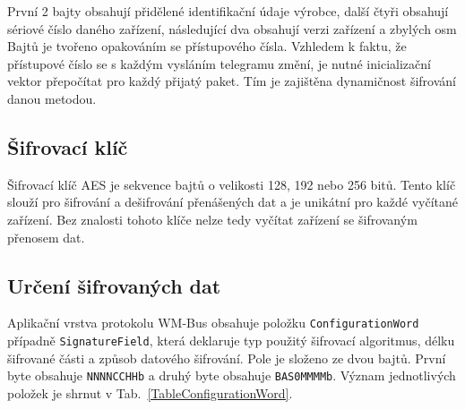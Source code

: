 První 2 bajty obsahují přidělené identifikační údaje výrobce, další čtyři obsahují sériové číslo daného zařízení, následující dva obsahují verzi zařízení a zbylých osm Bajtů je tvořeno opakováním se přístupového čísla. Vzhledem k faktu, že přístupové číslo se s každým vysláním telegramu změní, je nutné inicializační vektor přepočítat pro každý přijatý paket. Tím je zajištěna dynamičnost šifrování danou metodou.

\subsection{Šifrovací klíč}
Šifrovací klíč AES je sekvence bajtů o velikosti 128, 192 nebo 256 bitů. Tento klíč slouží pro šifrování a dešifrování přenášených dat a je unikátní pro každé vyčítané zařízení. Bez znalosti tohoto klíče nelze tedy vyčítat zařízení se šifrovaným přenosem dat.


\subsection{Určení šifrovaných dat}
Aplikační vrstva protokolu WM-Bus obsahuje položku \texttt{ConfigurationWord} případně \texttt{SignatureField}, která deklaruje typ použitý šifrovací algoritmus, délku šifrované části a způsob datového šifrování. Pole je složeno ze dvou bajtů. První byte obsahuje \texttt{NNNNCCHHb} a druhý byte obsahuje \texttt{BAS0MMMMb}. Význam jednotlivých položek je shrnut v Tab.~\ref{TableConfigurationWord}.


